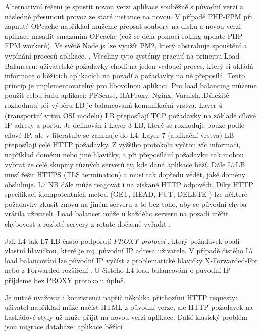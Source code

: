         Alternativní řešení je spustit novou verzi aplikace souběžně s původní verzí a následně přesunout provoz ze staré instance na novou. V případě PHP-FPM při zapnuté OPcache například můžeme přepsat soubory na disku a novou verzi aplikace nasadit smazáním OPcache (což se dělá pomocí rolling update PHP-FPM workerů). Ve světě Node.js lze využít PM2, který abstrahuje spouštění a vypínání procesů aplikace. . Všechny tyto systémy pracují na principu Load Balanceru: uživatelské požadavky chodí na jeden vedoucí proces, který si ukládá informace o běžících aplikacích na pozadí a požadavky na ně přeposílá. Tento princip je implementovatelný pro libovolnou aplikaci. Pro load balancing můžeme použít celou řadu aplikací: PFSense, HAProxy, Nginx, Varnish\ldots Důležité rozhodnutí při výběru LB je balancovaná komunikační vrstva. Layer 4 (transportní vrtva OSI modelu) LB přeposílají TCP požadavky na základě cílové IP adresy a portu. Je definován i Layer 3 LB, který se rozhoduje pouze podle cílové IP, ale v literatuře se zahrnuje do L4. Layer 7 (aplikační vrstva) LB přeposílají celé HTTP požadavky. Z vyššího protokolu vyčtou víc informací, například doménu nebo jiné hlavičky, a při přeposílání požadavku tak mohou vybrat ze celé skupiny různých serverů ty, kde daná aplikace běží. Dále L7LB musí řešit HTTPS (TLS termination) a musí tak dopředu vědět, jaké domény obsluhuje. L7 NB dále může reagovat i na získané HTTP odpovědi. Díky HTTP specifikaci idempotentních metod (GET, HEAD, PUT, DELETE \cite{http-idempotent}) lze některé požadavky zkusit znovu na jiném serveru a to bez toho, aby se původní chyba vrátila uživateli. Load balancer může u každého serveru na pozadí měřit chybovost a rozbité servery z rotate dočasně vyřadit .

        Jak L4 tak L7 LB často podporují \textit{PROXY protocol} \cite{tarreau-proxyprotocol}, který požadavek obalí vlastní hlavičkou, které je mj. původní IP adresa uživatele. V případě čistého L7 load balancování lze původní IP vyčíst z problematické \cite{hansen-xforwardedfor} hlavičky X-Forwarded-For nebo z Forwarded rozšíření \cite{http-forwarded}. U čistého L4 load balancování o původní IP příjdeme bez PROXY protokolu úplně.

        Je nutné uvažovat i konzistenci napříč několika příchozími HTTP requesty: uživatel například může načíst HTML z původní verze, ale HTTP požadavek na kaskádové styly už může přijít na novou verzi aplikace. Další klasický problém jsou migrace databáze: aplikace běžící

